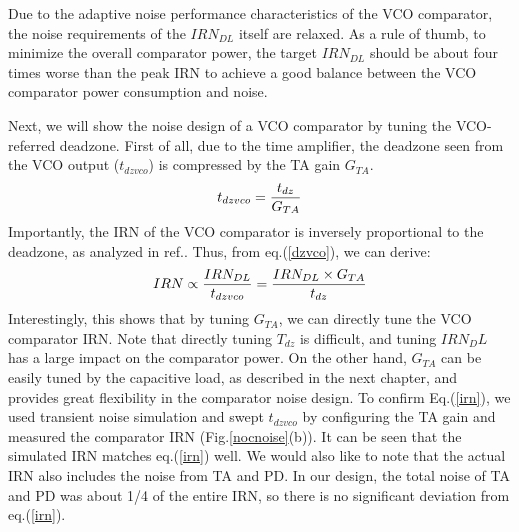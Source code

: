 \documentclass[letterpaper, 10 pt, conference]{ieeeconf}  %
\begin{document}
Due to the adaptive noise performance characteristics of the VCO comparator, the noise requirements of the $IRN_{DL}$ itself are relaxed. As a rule of thumb, to minimize the overall comparator power, the target $IRN_{DL}$ should be about four times worse than the peak IRN to achieve a good balance between the VCO comparator power consumption and noise. %

Next, we will show the noise design of a VCO comparator by tuning the VCO-referred deadzone.
First of all, due to the time amplifier, the deadzone seen from the VCO output ($t_{dzvco}$) is compressed by the TA gain $G_{TA}$.
\begin{eqnarray}
    \centering
    t_{dzvco} = \frac{t_{dz}}{G_{TA}}
    \label{dzvco}
\end{eqnarray}
Importantly, the IRN of the VCO comparator is inversely proportional to the deadzone, as analyzed in ref.\cite{luo2020input, ding20190}. Thus, from eq.(\ref{dzvco}), we can derive:
\begin{eqnarray}
    \centering
    IRN \propto \frac{IRN_{DL}}{t_{dzvco}} = \frac{IRN_{DL}\times G_{TA}}{t_{dz}}
    \label{irn}
\end{eqnarray}
Interestingly, this shows that by tuning $G_{TA}$, we can directly tune the VCO comparator IRN. Note that directly tuning $T_{dz}$ is difficult, and tuning $IRN_DL$ has a large impact on the comparator power. On the other hand, $G_{TA}$ can be easily tuned by the capacitive load, as described in the next chapter, and provides great flexibility in the comparator noise design. To confirm Eq.(\ref{irn}), we used transient noise simulation and swept $t_{dzvco}$ by configuring the TA gain and measured the comparator IRN (Fig.\ref{nocnoise}(b)). It can be seen that the simulated IRN matches eq.(\ref{irn}) well. We would also like to note that the actual IRN also includes the noise from TA and PD. In our design, the total noise of TA and PD was about 1/4 of the entire IRN, so there is no significant deviation from eq.(\ref{irn}).

\end{document}
